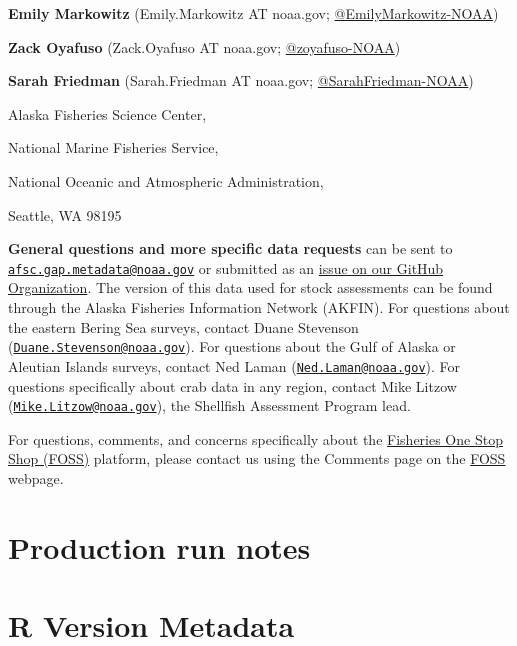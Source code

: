 \documentclass[
  letterpaper,
  oneside,
  open=any]{scrbook}
\begin{document}

\textbf{Emily Markowitz} (Emily.Markowitz AT noaa.gov;
\href{https://github.com/EmilyMarkowitz-NOAA}{@EmilyMarkowitz-NOAA})

\textbf{Zack Oyafuso} (Zack.Oyafuso AT noaa.gov;
\href{https://github.com/zoyafuso-NOAA}{@zoyafuso-NOAA})

\textbf{Sarah Friedman} (Sarah.Friedman AT noaa.gov;
\href{https://github.com/SarahFriedman-NOAA}{@SarahFriedman-NOAA})

Alaska Fisheries Science Center,

National Marine Fisheries Service,

National Oceanic and Atmospheric Administration,

Seattle, WA 98195

\textbf{General questions and more specific data requests} can be sent
to
\href{mailto:afsc.gap.metadata@noaa.gov}{\nolinkurl{afsc.gap.metadata@noaa.gov}}
or submitted as an
\href{https://github.com/afsc-gap-products/data-requests}{issue on our
GitHub Organization}. The version of this data used for stock
assessments can be found through the Alaska Fisheries Information
Network (AKFIN). For questions about the eastern Bering Sea surveys,
contact Duane Stevenson
(\href{mailto:Duane.Stevenson@noaa.gov}{\nolinkurl{Duane.Stevenson@noaa.gov}}).
For questions about the Gulf of Alaska or Aleutian Islands surveys,
contact Ned Laman
(\href{mailto:Ned.Laman@noaa.gov}{\nolinkurl{Ned.Laman@noaa.gov}}). For
questions specifically about crab data in any region, contact Mike
Litzow
(\href{mailto:Mike.Litzow@noaa.gov}{\nolinkurl{Mike.Litzow@noaa.gov}}),
the Shellfish Assessment Program lead.

For questions, comments, and concerns specifically about the
\href{https://www.fisheries.noaa.gov/foss}{Fisheries One Stop Shop
(FOSS)} platform, please contact us using the Comments page on the
\href{https://www.fisheries.noaa.gov/foss}{FOSS} webpage.

\hypertarget{production-run-notes}{%
\chapter{Production run notes}\label{production-run-notes}}

\hypertarget{r-version-metadata}{%
\chapter{R Version Metadata}\label{r-version-metadata}}
\end{document}

